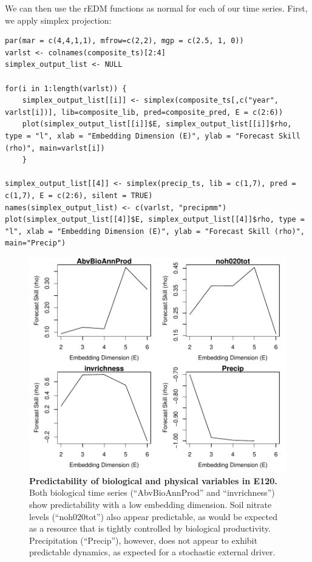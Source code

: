 We can then use the rEDM functions as normal for each of our time series. First, we apply simplex projection:
 
\begin{lstlisting}
par(mar = c(4,4,1,1), mfrow=c(2,2), mgp = c(2.5, 1, 0))
varlst <- colnames(composite_ts)[2:4]
simplex_output_list <- NULL

for(i in 1:length(varlst)) {
    simplex_output_list[[i]] <- simplex(composite_ts[,c("year", varlst[i])], lib=composite_lib, pred=composite_pred, E = c(2:6))
    plot(simplex_output_list[[i]]$E, simplex_output_list[[i]]$rho, type = "l", xlab = "Embedding Dimension (E)", ylab = "Forecast Skill (rho)", main=varlst[i])
    }

simplex_output_list[[4]] <- simplex(precip_ts, lib = c(1,7), pred = c(1,7), E = c(2:6), silent = TRUE)
names(simplex_output_list) <- c(varlst, "precipmm")
plot(simplex_output_list[[4]]$E, simplex_output_list[[4]]$rho, type = "l", xlab = "Embedding Dimension (E)", ylab = "Forecast Skill (rho)", main="Precip")
\end{lstlisting}

\begin{figure}[!ht]
\begin{center}\includegraphics[width=\maxwidth{\textwidth}]{fig_redm_9.pdf}\end{center}
\caption[Predictability of biological and physical variables in E120.]{\textbf{Predictability of biological and physical variables in E120.}\newline
Both biological time series (``AbvBioAnnProd'' and ``invrichness'') show predictability with a low embedding dimension. Soil nitrate levels (``noh020tot'') also appear predictable, as would be expected as a resource that is tightly controlled by biological productivity. Precipitation (``Precip''), however, does not appear to exhibit predictable dynamics, as expected for a stochastic external driver.}
\label{fig_e120_simplex}
\end{figure}

